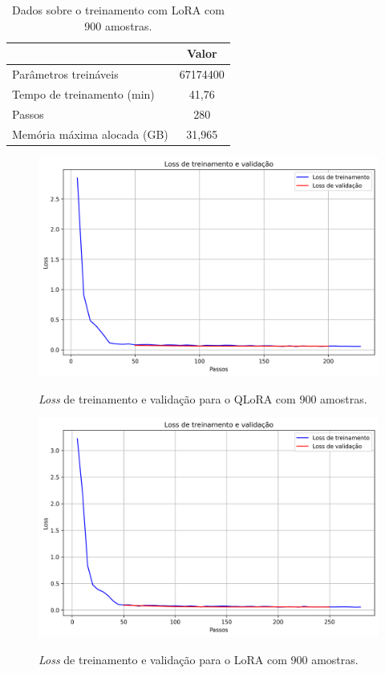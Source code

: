 \begin{table}[ht]
    \caption{\small Dados sobre o treinamento com \ac{LoRA} com 900 amostras.}
    \centering
    \begin{tabular}{l|c}
        \hline
                                    & Valor    \\ \hline
        Parâmetros treináveis       & 67174400 \\
        Tempo de treinamento (min)  & 41,76    \\
        Passos                      & 280      \\
        Memória máxima alocada (GB) & 31,965   \\ \hline
    \end{tabular}
    \label{tab:lora_1000_training}
\end{table}

\clearpage

\begin{figure}[ht]
    \centering
    \caption{\small \textit{Loss} de treinamento e validação para o \ac{QLoRA} com 900 amostras.}
    \includegraphics[width=0.725\columnwidth,keepaspectratio]{images/loss_qlora_1000.png}
    \label{fig:loss_qlora_1000}
\end{figure}

\begin{figure}[ht]
    \centering
    \caption{\small \textit{Loss} de treinamento e validação para o \ac{LoRA} com 900 amostras.}
    \includegraphics[width=0.725\columnwidth,keepaspectratio]{images/loss_lora_1000.png}
    \label{fig:loss_lora_1000}
\end{figure}

